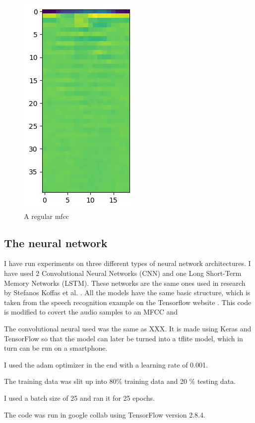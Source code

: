 \documentclass{article}
\theoremstyle{definition}
\theoremstyle{remark}
\begin{document}
\begin{figure}[!hbt]
    \centering
    \includegraphics[scale=0.4]{img/mfcc_nopoison.png}
    \caption{A regular mfcc}
    \label{fig:mfcc_regular}
\end{figure}


\subsection{The neural network}
I have run experiments on three different types of neural network architectures. I have used 2 Convolutional Neural Networks (CNN) and one Long Short-Term Memory Networks (LSTM). These networks are the same ones used in research by Stefanos Koffas et al. \cite{CYHI}. All the models have the same basic structure, which is taken from the speech recognition example on the Tensorflow website \cite{TenserflowExample}. This code is modified to covert the audio samples to an MFCC and 

The convolutional neural used was the same as XXX. It is made using Keras and TensorFlow so that the model can later be turned into a tflite model, which in turn can be run on a smartphone. 

I used the adam optimizer in the end with a learning rate of 0.001.

The training data was slit up into 80\% training data and 20 \% testing data.

I used a batch size of 25 and ran it for 25 epochs. 

The code was run in google collab using TensorFlow version 2.8.4.
\end{document}
